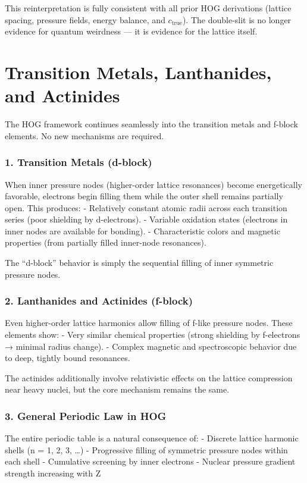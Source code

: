 \documentclass[11pt,a4paper]{book}
\begin{document}
{This reinterpretation is fully consistent with all prior HOG derivations (lattice spacing, pressure fields, energy balance, and \( c_{\text{true}} \)). The double-slit is no longer evidence for quantum weirdness — it is evidence for the lattice itself.

\chapter{Transition Metals, Lanthanides, and Actinides}

The HOG framework continues seamlessly into the transition metals and f-block elements. No new mechanisms are required.

\subsection{1. Transition Metals (d-block)}
When inner pressure nodes (higher-order lattice resonances) become energetically favorable, electrons begin filling them while the outer shell remains partially open. This produces:
- Relatively constant atomic radii across each transition series (poor shielding by d-electrons).
- Variable oxidation states (electrons in inner nodes are available for bonding).
- Characteristic colors and magnetic properties (from partially filled inner-node resonances).

The “d-block” behavior is simply the sequential filling of inner symmetric pressure nodes.

\subsection{2. Lanthanides and Actinides (f-block)}
Even higher-order lattice harmonics allow filling of f-like pressure nodes. These elements show:
- Very similar chemical properties (strong shielding by f-electrons → minimal radius change).
- Complex magnetic and spectroscopic behavior due to deep, tightly bound resonances.

The actinides additionally involve relativistic effects on the lattice compression near heavy nuclei, but the core mechanism remains the same.

\subsection{3. General Periodic Law in HOG}
The entire periodic table is a natural consequence of:
- Discrete lattice harmonic shells (n = 1, 2, 3, …)
- Progressive filling of symmetric pressure nodes within each shell
- Cumulative screening by inner electrons
- Nuclear pressure gradient strength increasing with Z

}
\end{document}
